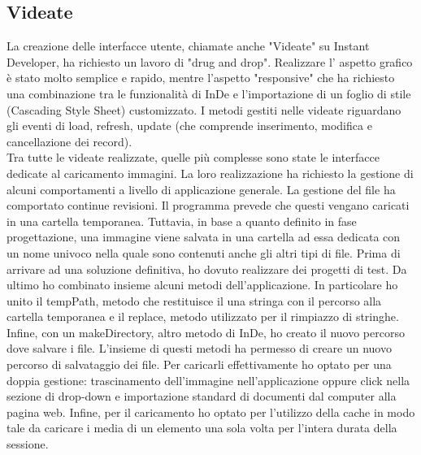 \subsection{Videate}
La creazione delle interfacce utente, chiamate anche "Videate" su Instant Developer, ha richiesto un lavoro di "drug and drop". Realizzare l' aspetto grafico è stato molto semplice e rapido, mentre l'aspetto "responsive" che ha richiesto una combinazione tra le funzionalità di InDe e l'importazione di un foglio di stile (Cascading Style Sheet) customizzato.
I metodi gestiti nelle videate riguardano gli eventi di load, refresh, update (che comprende inserimento, modifica e cancellazione dei record).\\

Tra tutte le videate realizzate, quelle più complesse sono state le interfacce dedicate al caricamento immagini. La loro realizzazione ha richiesto la gestione di alcuni comportamenti a livello di applicazione generale.
La gestione del file ha comportato continue revisioni. Il programma prevede che questi vengano caricati in una cartella temporanea. Tuttavia, in base a quanto definito in fase progettazione, una immagine viene salvata in una cartella ad essa dedicata con un nome univoco nella quale sono contenuti anche gli altri tipi di file. 
Prima di arrivare ad una soluzione definitiva, ho dovuto realizzare dei progetti di test. Da ultimo ho combinato insieme alcuni metodi dell'applicazione. In particolare ho unito il tempPath, metodo che restituisce il una stringa con il percorso alla cartella temporanea e il replace, metodo utilizzato per il rimpiazzo di stringhe. Infine, con un makeDirectory, altro metodo di InDe, ho creato il nuovo percorso dove salvare i file. 
L'insieme di questi metodi ha permesso di creare un nuovo percorso di salvataggio dei file. Per caricarli effettivamente ho optato per una doppia gestione: trascinamento dell'immagine nell'applicazione oppure click nella sezione di drop-down e importazione standard di documenti dal computer alla pagina web. 
Infine, per il caricamento ho optato per l'utilizzo della cache in modo tale da caricare i media di un elemento una sola volta per l'intera durata della sessione.\\

